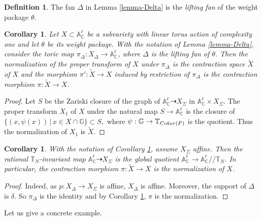 \documentclass[11pt, reqno]{amsart}
\theoremstyle{plain}
\newtheorem{corollary}[theorem]{Corollary}
\theoremstyle{definition}
\newtheorem{definition}[theorem]{Definition}
\theoremstyle{remark}
\begin{document}
\begin{definition}
The fan $\Delta$ in Lemma \ref{lemma-Delta} is the \emph{lifting fan} of the weight package $\theta$. 
\end{definition}
\begin{corollary}\label{Cor-Delta1}
Let $X\subset \mathbb{A}_{\mathbb{C}}^{\ell}$ be a subvariety with linear torus action of complexity one  and let $\theta$ be its weight package.
With the notation of Lemma \ref{lemma-Delta}, consider the toric map $\pi_{\Delta}: X_{\Delta}\rightarrow \mathbb{A}_{\mathbb{C}}^{\ell}$, where $\Delta$ is the lifting fan of $\theta$. Then the normalization of the proper transform of $X$ 
under $\pi_{\Delta}$ is the contraction space $\widetilde{X}$ of $X$ and the morphism  $\pi': \widetilde{X}\rightarrow X$ induced by restriction of $\pi_{\Delta}$ is the contraction morphism $\pi: \widetilde{X}\rightarrow X$. 
\end{corollary}
\begin{proof}
Let $S$ be the Zariski closure of the graph of $\mathbb{A}_{\mathbb{C}}^{\ell}\dashrightarrow X_{\Sigma}$ in $\mathbb{A}_{\mathbb{C}}^{\ell}\times X_{\Sigma}$. The proper transform $X_{1}$ of $X$ under the natural map $S\rightarrow \mathbb{A}_{\mathbb{C}}^{\ell}$ is the closure
of 
$\{(x, \psi(x))\,|\, x\in X\cap \mathbb{G}\}\subset S,$ where $\psi:\mathbb{G}\rightarrow \mathbb{T}_{{\rm Coker}(F)}$ is the quotient. Thus the normalization of $X_{1}$ is $\widetilde{X}$.
\end{proof}
\begin{corollary}
With the notation of Corollary \ref{Cor-Delta1}, assume $X_{\Sigma}$ affine. Then the rational $\mathbb{T}_{N}$-invariant map 
$\mathbb{A}_{\mathbb{C}}^{\ell}\dashrightarrow X_{\Sigma}$ is the global quotient $\mathbb{A}_{\mathbb{C}}^{\ell}\rightarrow \mathbb{A}_{\mathbb{C}}^{\ell} /\!\!/\mathbb{T}_{N}$. In particular, the contraction morphism $\pi:\widetilde{X}\rightarrow X$
is  the normalization of $X$.
\end{corollary}
\begin{proof}
Indeed, as $p:X_{\Delta}\rightarrow X_{\Sigma}$ is affine,  $X_{\Delta}$ is affine. Moreover, the support of $\Delta$ is $\delta$. So $\pi_{\Delta}$ is the identity and by Corollary \ref{Cor-Delta1}, $\pi$ is the normalization. 
\end{proof}
Let us give a concrete example.
\end{document}

